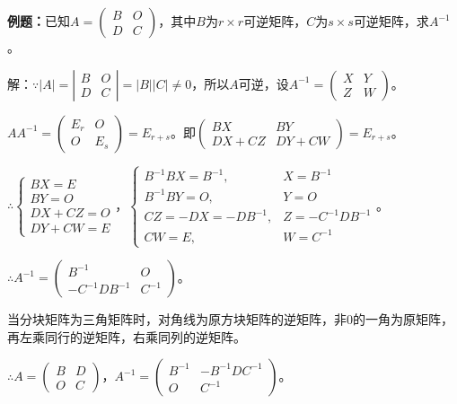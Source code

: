 \documentclass[UTF8, 12pt]{ctexart}
\begin{document}
\textbf{例题：}已知$A=\left(\begin{array}{cc}
    B & O \\
    D & C
\end{array}\right)$，其中$B$为$r\times r$可逆矩阵，$C$为$s\times s$可逆矩阵，求$A^{-1}$。

解：$\because\vert A\vert=\left|\begin{array}{cc}
    B & O \\
    D & C
\end{array}\right|=\vert B\vert\vert C\vert\neq0$，所以$A$可逆，设$A^{-1}=\left(\begin{array}{cc}
    X & Y \\
    Z & W
\end{array}\right)$。

$AA^{-1}=\left(\begin{array}{cc}
    E_r & O \\
    O & E_s
\end{array}\right)=E_{r+s}$。即$\left(\begin{array}{cc}
    BX & BY \\
    DX+CZ & DY+CW
\end{array}\right)=E_{r+s}$。

$\therefore\left\{\begin{array}{l}
    BX=E \\
    BY=O \\
    DX+CZ=O \\
    DY+CW=E
\end{array}\right.$，$\left\{\begin{array}{ll}
    B^{-1}BX=B^{-1}, & X=B^{-1}\\
    B^{-1}BY=O, & Y=O \\
    CZ=-DX=-DB^{-1}, & Z=-C^{-1}DB^{-1} \\
    CW=E, & W=C^{-1}
\end{array}\right.$。

$\therefore A^{-1}=\left(\begin{array}{cc}
    B^{-1} & O \\
    -C^{-1}DB^{-1} & C^{-1}
\end{array}\right)$。\medskip

当分块矩阵为三角矩阵时，对角线为原方块矩阵的逆矩阵，非0的一角为原矩阵，再左乘同行的逆矩阵，右乘同列的逆矩阵。\medskip

$\therefore A=\left(\begin{array}{cc}
    B & D \\
    O & C
\end{array}\right)$，$A^{-1}=\left(\begin{array}{cc}
    B^{-1} & -B^{-1}DC^{-1} \\
    O & C^{-1}
\end{array}\right)$。\medskip
\end{document}
